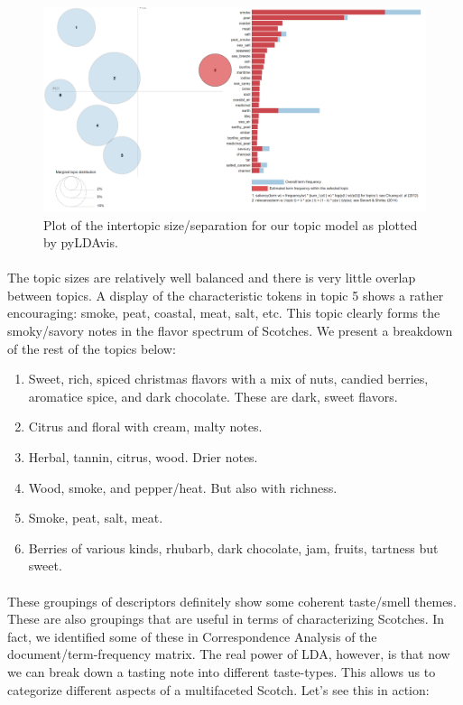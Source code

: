 \documentclass{article}
\begin{document}
		 	 \begin{figure}[H]
	\begin{center}
		\includegraphics[totalheight=6cm]{../images/Modeling/PyLDAvis_topmodel}
	\end{center}
	\caption{Plot of the intertopic size/separation for our topic model as plotted by pyLDAvis.  }
\end{figure}
\paragraph{} The topic sizes are relatively well balanced and there is very little overlap between topics. A display of the characteristic tokens in topic 5 shows a rather encouraging: smoke, peat, coastal, meat, salt, etc. This topic clearly forms the smoky/savory notes in the flavor spectrum of Scotches. We present a breakdown of the rest of the topics below:
\begin{enumerate}
	\item  Sweet, rich, spiced christmas flavors with a mix of nuts, candied berries, aromatice spice, and dark chocolate. These are dark, sweet flavors.
	\item Citrus and floral with cream, malty notes.
	\item Herbal, tannin, citrus, wood. Drier notes.
	\item Wood, smoke, and pepper/heat. But also with richness.
	\item Smoke, peat, salt, meat.
	\item  Berries of various kinds, rhubarb, dark chocolate, jam, fruits, tartness but sweet. 
\end{enumerate}
\paragraph{} These groupings of descriptors definitely show some coherent taste/smell themes. These are also groupings that are useful in terms of characterizing Scotches. In fact, we identified some of these in Correspondence Analysis of the document/term-frequency matrix. The real power of LDA, however, is that now we can break down a tasting note into different taste-types. This allows us to categorize different aspects of a multifaceted Scotch. Let's see this in action:
\end{document}
